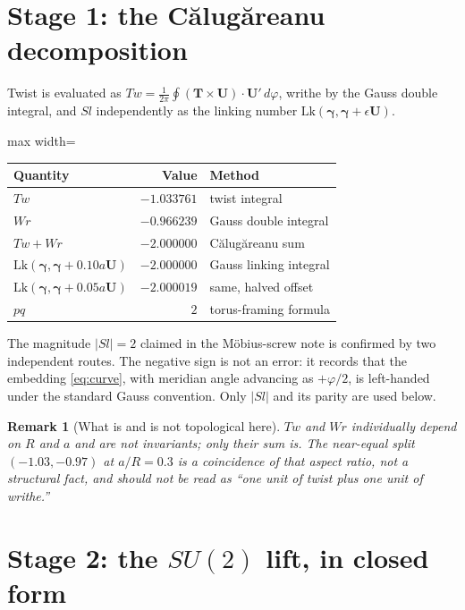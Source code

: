\documentclass[11pt,a4paper]{article}
\newtheorem{remark}{Remark}
\begin{document}
\section{Stage 1: the C\u{a}lug\u{a}reanu decomposition}

Twist is evaluated as
$Tw = \tfrac{1}{2\pi}\oint (\bm{T}\times\bm{U})\cdot \bm{U}'\,d\varphi$,
writhe by the Gauss double integral, and $Sl$ independently as the linking
number $\mathrm{Lk}(\bm{\gamma},\bm{\gamma}+\epsilon\bm{U})$.

\begin{center}
\begin{adjustbox}{max width=\linewidth}\begin{tabular}{@{}lrl@{}}
\toprule
Quantity & Value & Method \\
\midrule
$Tw$                 & $-1.033761$ & twist integral \\
$Wr$                 & $-0.966239$ & Gauss double integral \\
$Tw + Wr$            & $-2.000000$ & C\u{a}lug\u{a}reanu sum \\
$\mathrm{Lk}(\bm{\gamma},\bm{\gamma}+0.10a\bm{U})$ & $-2.000000$ & Gauss linking integral \\
$\mathrm{Lk}(\bm{\gamma},\bm{\gamma}+0.05a\bm{U})$ & $-2.000019$ & same, halved offset \\
$pq$                 & $2$         & torus-framing formula \\
\bottomrule
\end{tabular}\end{adjustbox}
\end{center}

The magnitude $|Sl| = 2$ claimed in the M\"obius-screw note is confirmed
by two independent routes.  The negative sign is not an error: it records
that the embedding \eqref{eq:curve}, with meridian angle advancing as
$+\varphi/2$, is left-handed under the standard Gauss convention.  Only
$|Sl|$ and its parity are used below.

\begin{remark}[What is and is not topological here]
$Tw$ and $Wr$ individually depend on $R$ and $a$ and are not invariants;
only their sum is.  The near-equal split
$(-1.03, -0.97)$ at $a/R = 0.3$ is a coincidence of that aspect ratio, not
a structural fact, and should not be read as ``one unit of twist plus one
unit of writhe.''
\end{remark}

\section{Stage 2: the $SU(2)$ lift, in closed form}
\end{document}
